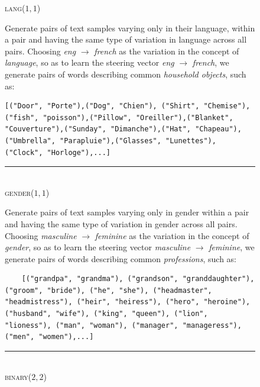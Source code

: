 \documentclass{article}
\begin{document}
\begin{figure}
\begin{subbox}
\textsc{lang}($1, 1$) 
\vspace{1mm}

Generate pairs of text samples varying only in their language, within a pair and having the same type of variation in language across all pairs. Choosing \textit{eng} $\rightarrow$ \textit{french} as the variation in the concept of \textit{language}, so as to learn the steering vector \textit{eng} $\rightarrow$ \textit{french}, we generate pairs of words describing common \textit{household objects}, such as: 

\begin{lstlisting}
[("Door", "Porte"),("Dog", "Chien"), ("Shirt", "Chemise"),("fish", "poisson"),("Pillow", "Oreiller"),("Blanket", "Couverture"),("Sunday", "Dimanche"),("Hat", "Chapeau"),("Umbrella", "Parapluie"),("Glasses", "Lunettes"), ("Clock", "Horloge"),...]
\end{lstlisting}

\rule{\linewidth}{0.5pt}\\

\textsc{gender}($1, 1$) 
\vspace{1mm}

Generate pairs of text samples varying only in gender within a pair and having the same type of variation in gender across all pairs. Choosing \textit{masculine} $\rightarrow$ \textit{feminine} as the variation in the concept of \textit{gender}, so as to learn the steering vector \textit{masculine} $\rightarrow$ \textit{feminine}, we generate pairs of words describing common \textit{professions}, such as: 
\begin{lstlisting}
    [("grandpa", "grandma"), ("grandson", "granddaughter"), ("groom", "bride"), ("he", "she"), ("headmaster", "headmistress"), ("heir", "heiress"), ("hero", "heroine"), ("husband", "wife"), ("king", "queen"), ("lion", "lioness"), ("man", "woman"), ("manager", "manageress"), ("men", "women"),...]
\end{lstlisting}

\rule{\linewidth}{0.5pt}\\

\textsc{binary}($2, 2$) 
\vspace{1mm}


\end{subbox}
\end{figure}
\end{document}
